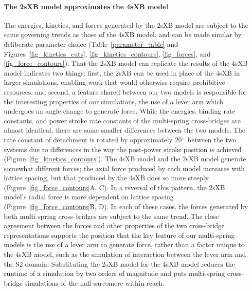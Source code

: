 \documentclass[10pt]{article}
\newcommand{\de}{$^\circ$} %
\begin{document}
\paragraph*{The 2sXB model approximates the 4sXB model} %
The energies, kinetics, and forces generated by the 2sXB model are subject to the same governing trends as those of the 4sXB model, and can be made similar by deliberate parameter choice (Table~\ref{parameter_table} and Figures~\ref{fig_kinetics_cuts}, \ref{fig_kinetics_contours}, \ref{fig_forces}, and \ref{fig_force_contours}). 
That the 2sXB model can replicate the results of the 4sXB model indicates two things: first, the 2sXB can be used in place of the 4sXB in larger simulations, enabling work that would otherwise require prohibitive resources, and second, a feature shared between our two models is responsible for the interesting properties of our simulations, the use of a lever arm which undergoes an angle change to generate force. 
While the energies, binding rate constants, and power stroke rate constants of the multi-spring cross-bridges are almost identical, there are some smaller differences between the two models. 
The rate constant of detachment is rotated by approximately 20\de~between the two systems due to differences in the way the post-power stroke position is achieved (Figure~\ref{fig_kinetics_contours}).
The 4sXB model and the 2sXB model generate somewhat different forces; the axial force produced by each model increases with lattice spacing, but that produced by the 4sXB does so more steeply (Figure~\ref{fig_force_contours}A, C). 
In a reversal of this pattern, the 2sXB model's radial force is more dependent on lattice spacing (Figure~\ref{fig_force_contours}B, D).  
In each of these cases, the forces generated by both multi-spring cross-bridges are subject to the same trend.
The close agreement between the forces and other properties of the two cross-bridge representations supports the position that the key feature of our multi-spring models is the use of a lever arm to generate force, rather than a factor unique to the 4sXB model, such as the simulation of interaction between the lever arm and the S2 domain. 
Substituting the 2sXB model for the 4sXB model reduces the runtime of a simulation by two orders of magnitude and puts multi-spring cross-bridge simulations of the half-sarcomere within reach.
\end{document}
